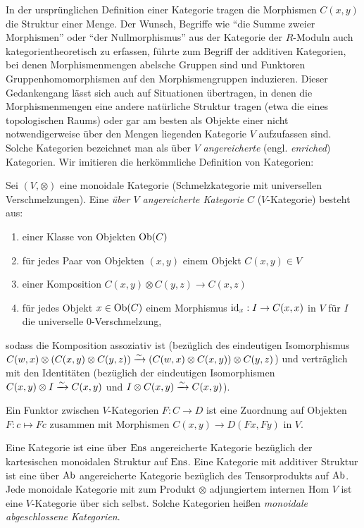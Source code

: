 In der ursprünglichen Definition einer Kategorie tragen die Morphismen
$C(x, y)$ die Struktur einer Menge. Der Wunsch, Begriffe wie ``die
Summe zweier Morphismen'' oder ``der Nullmorphismus'' aus der
Kategorie der $R$-Moduln auch kategorientheoretisch zu erfassen,
führte zum Begriff der additiven Kategorien, bei denen
Morphismenmengen abelsche Gruppen sind und Funktoren
Gruppenhomomorphismen auf den Morphismengruppen induzieren. Dieser
Gedankengang lässt sich auch auf Situationen übertragen, in denen die
Morphismenmengen eine andere natürliche Struktur tragen (etwa die
eines topologischen Raums) oder gar am besten als Objekte einer nicht
notwendigerweise über den Mengen liegenden Kategorie $V$ aufzufassen
sind. Solche Kategorien bezeichnet man als über $V$
\emph{angereicherte} (engl. \emph{enriched}) Kategorien. Wir imitieren
die herkömmliche Definition von Kategorien:
\begin{defn}
  Sei $(V, \otimes)$ eine monoidale Kategorie (Schmelzkategorie mit
  universellen Verschmelzungen). Eine \emph{über $V$ angereicherte
    Kategorie} $C$ ($V$-Kategorie) besteht aus:
  \begin{enumerate}
  \item einer Klasse von Objekten $\operatorname{Ob}(C)$
  \item für jedes Paar von Objekten $(x, y)$ einem Objekt $C(x,y) \in
    V$
  \item einer Komposition $C(x, y) \otimes C(y, z) \to C(x, z)$
  \item für jedes Objekt $x \in \operatorname{Ob}(C)$ einem Morphismus $\operatorname{id}_x: I \to
    C(x, x)$ in $V$ für $I$ die universelle 0-Verschmelzung,
  \end{enumerate}
  sodass die Komposition assoziativ ist (bezüglich des eindeutigen
  Isomorphismus $C(w,x) \otimes (C(x,y) \otimes C(y,z)) \xrightarrow[]{\sim} (C(w,x)
  \otimes C(x,y)) \otimes C(y,z)$) und verträglich mit den Identitäten
  (bezüglich der eindeutigen Isomorphismen $C(x, y) \otimes I \xrightarrow[]{\sim}
  C(x, y)$ und $I \otimes C(x,y) \xrightarrow[]{\sim} C(x,y)$).

  Ein Funktor zwischen $V$-Kategorien $F: C \to D$ ist eine Zuordnung
  auf Objekten $F: c \mapsto Fc$ zusammen mit Morphismen $C(x, y) \to
  D(Fx, Fy)$ in $V$.
\end{defn}
\begin{bsp}
  Eine Kategorie ist eine über $\operatorname{Ens}$ angereicherte Kategorie
  bezüglich der kartesischen monoidalen Struktur auf $\operatorname{Ens}$. Eine
  Kategorie mit additiver Struktur ist eine über $\operatorname{Ab}$ angereicherte
  Kategorie bezüglich des Tensorprodukts auf $\operatorname{Ab}$. Jede monoidale
  Kategorie mit zum Produkt $\otimes$ adjungiertem internen Hom $V$
  ist eine $V$-Kategorie über sich selbst. Solche Kategorien heißen
  \emph{monoidale abgeschlossene Kategorien}.
\end{bsp}

